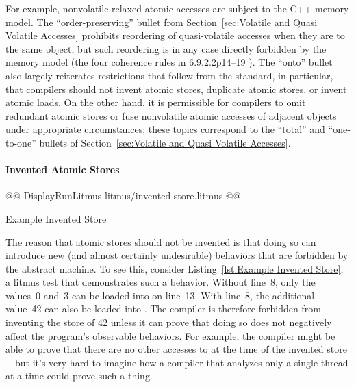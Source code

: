 \documentclass[10]{article}
\begin{document}
For example, nonvolatile relaxed atomic accesses are subject to the
C++ memory model.
The ``order-preserving'' bullet from
Section~\ref{sec:Volatile and Quasi Volatile Accesses}
prohibits reordering of quasi-volatile accesses when they are
to the same object,
but such reordering is in any case directly forbidden by the memory model
(the four coherence rules in 6.9.2.2p14--19 ).
The ``onto'' bullet also largely reiterates restrictions that follow
from the standard, in particular,
that compilers should not invent atomic stores,
duplicate atomic stores, or invent atomic loads.
On the other hand, it is permissible for compilers to omit redundant
atomic stores or fuse nonvolatile atomic accesses of adjacent objects
under appropriate circumstances;
these topics correspond to the ``total'' and ``one-to-one'' bullets of
Section~\ref{sec:Volatile and Quasi Volatile Accesses}.

\paragraph{Invented Atomic Stores}
\begin{listing}[tbp]
@@ DisplayRunLitmus litmus/invented-store.litmus @@
\caption{Example Invented Store}
\label{lst:Example Invented Store}
\end{listing}
The reason that atomic stores should not be invented is that doing so can
introduce new (and almost certainly undesirable) behaviors that are
forbidden by the abstract machine.
To see this, consider Listing~\ref{lst:Example Invented Store},
a  litmus test that demonstrates such a behavior.
Without line~8, only the values~0 and~3 can be loaded into  on
line~13.
With line~8, the additional value~42 can also be loaded into .
The compiler is therefore forbidden from inventing the store of 42
unless it can prove that doing so does not negatively affect the
program's observable behaviors.
For example, the compiler might be able to prove that there
are no other accesses to  at the time of the invented
store---but it's very hard to imagine how a compiler that analyzes
only a single thread at a time could prove such a thing.
\end{document}
